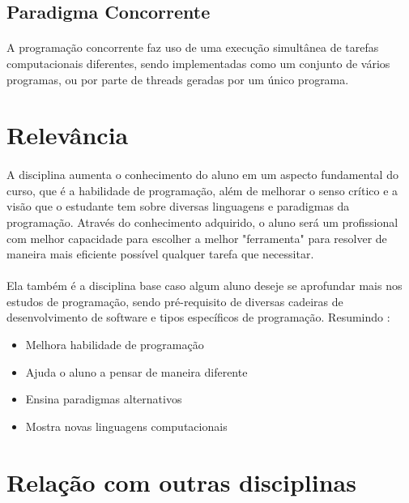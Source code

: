 \documentclass[a4paper]{article}
\begin{document}
\subsection{Paradigma Concorrente}

\paragraph{} A programação concorrente faz uso de uma execução simultânea de tarefas computacionais diferentes, sendo implementadas como um conjunto de vários programas, ou por parte de threads geradas por um único programa.

\newpage
\section{Relevância}

\paragraph{} A disciplina aumenta o conhecimento do aluno em um aspecto fundamental do curso, que é a habilidade de programação, além de melhorar o senso crítico e a visão que o estudante tem sobre diversas linguagens e paradigmas da programação. Através do conhecimento adquirido, o aluno será um profissional com melhor capacidade para escolher a melhor "ferramenta" para resolver de maneira mais eficiente possível qualquer tarefa que necessitar.

\paragraph{} Ela também é a disciplina base caso algum aluno deseje se aprofundar mais nos estudos de programação, sendo pré-requisito de diversas cadeiras de desenvolvimento de software e tipos específicos de programação. Resumindo :

\begin{itemize}
\item Melhora habilidade de programação
\item Ajuda o aluno a pensar de maneira diferente
\item Ensina paradigmas alternativos
\item Mostra novas linguagens computacionais
\end{itemize}

\section{Relação com outras disciplinas}
\end{document}
